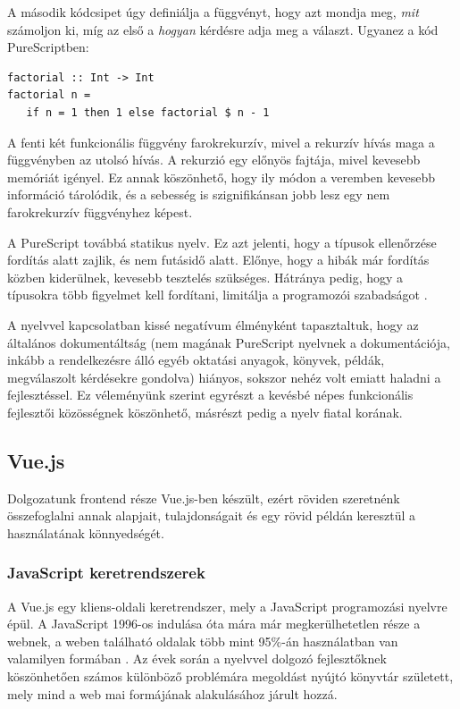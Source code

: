 \documentclass[12pt]{article}
\begin{document}
A második kódcsipet úgy definiálja a függvényt, hogy azt mondja meg, \textit{mit} számoljon ki, míg az első a \textit{hogyan} kérdésre adja meg a választ. Ugyanez a kód PureScriptben:

\begin{verbatim}
factorial :: Int -> Int
factorial n =
   if n = 1 then 1 else factorial $ n - 1
\end{verbatim}

A fenti két funkcionális függvény farokrekurzív, mivel a rekurzív hívás maga a függvényben az utolsó hívás. A rekurzió egy előnyös fajtája, mivel kevesebb memóriát igényel. Ez annak köszönhető, hogy ily módon a veremben kevesebb információ tárolódik, és a sebesség is szignifikánsan jobb lesz egy nem farokrekurzív függvényhez képest.

A PureScript továbbá statikus nyelv.  Ez azt jelenti, hogy a típusok ellenőrzése fordítás alatt zajlik, és nem futásidő alatt. Előnye, hogy a hibák már fordítás közben kiderülnek,  kevesebb tesztelés szükséges. Hátránya pedig, hogy a típusokra több figyelmet kell fordítani, limitálja a programozói szabadságot \cite{CS}.

A nyelvvel kapcsolatban kissé negatívum élményként tapasztaltuk, hogy az általános dokumentáltság (nem magának PureScript nyelvnek a dokumentációja, inkább a rendelkezésre álló egyéb oktatási anyagok, könyvek, példák, megválaszolt kérdésekre gondolva) hiányos, sokszor nehéz volt emiatt haladni a fejlesztéssel. Ez véleményünk szerint egyrészt a kevésbé népes funkcionális fejlesztői közösségnek köszönhető, másrészt pedig a nyelv fiatal korának.

\newpage
\subsection{Vue.js}

Dolgozatunk frontend része Vue.js-ben készült,  ezért röviden szeretnénk összefoglalni annak alapjait, tulajdonságait és egy rövid példán keresztül a használatának könnyedségét.

\subsubsection{JavaScript keretrendszerek}

A Vue.js egy kliens-oldali keretrendszer, mely a JavaScript programozási nyelvre épül. A JavaScript 1996-os indulása óta mára már megkerülhetetlen része a webnek, a weben található oldalak több mint 95\%-án használatban van valamilyen formában \cite{JS_USAGE}. Az évek során a nyelvvel dolgozó fejlesztőknek köszönhetően számos különböző problémára megoldást nyújtó könyvtár született, mely mind a web mai formájának alakulásához járult hozzá.
\end{document}
